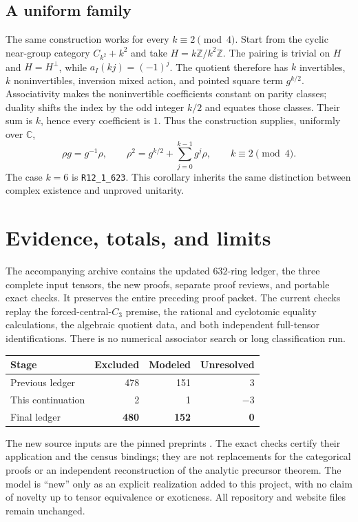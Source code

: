 \documentclass[11pt]{article}
\newcommand{\R}[1]{\texttt{R12\_1\_#1}}
\newcommand{\C}{\mathbb C}
\newcommand{\Z}{\mathbb Z}
\begin{document}
\subsection{A uniform family}
The same construction works for every $k\equiv2\pmod4$. Start from
the cyclic near-group category $C_{k^2}+k^2$ and take
$H=k\Z/k^2\Z$. The pairing is trivial on $H$ and $H=H^\perp$,
while $a_I(kj)=(-1)^j$. The quotient therefore has $k$ invertibles,
$k$ noninvertibles, inversion mixed action, and pointed square term
$g^{k/2}$. Associativity makes the noninvertible coefficients constant
on parity classes; duality shifts the index by the odd integer $k/2$
and equates those classes. Their sum is $k$, hence every coefficient
is $1$. Thus the construction supplies, uniformly over $\C$,
\[
 \rho g=g^{-1}\rho,\qquad
 \rho^2=g^{k/2}+\sum_{j=0}^{k-1}g^j\rho,
 \qquad k\equiv2\pmod4.
\]
The case $k=6$ is \R{623}. This corollary inherits the same
distinction between complex existence and unproved unitarity.

\section{Evidence, totals, and limits}
The accompanying archive contains the updated $632$-ring ledger, the
three complete input tensors, the new proofs, separate proof reviews,
and portable exact checks. It preserves the entire preceding proof
packet. The current checks replay the forced-central-$C_3$ premise,
the rational and cyclotomic equality calculations, the algebraic
quotient data, and both independent full-tensor identifications.
There is no numerical associator search or long classification run.

\begin{center}
\begin{tabular}{lrrr}\toprule
Stage&Excluded&Modeled&Unresolved\\\midrule
Previous ledger&478&151&3\\
This continuation&2&1&$-3$\\
Final ledger&\textbf{480}&\textbf{152}&\textbf{0}\\\bottomrule
\end{tabular}
\end{center}
The new source inputs are the pinned preprints \cite{Sch26,TPE}.
The exact checks certify their application and the census bindings;
they are not replacements for the categorical proofs or an independent
reconstruction of the analytic precursor theorem. The model is
``new'' only as an explicit realization added to this project, with no
claim of novelty up to tensor equivalence or exoticness.
All repository and website files remain unchanged.
\end{document}
